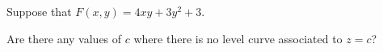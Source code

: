\begin{question}
Suppose that $F(x,y) = 4xy+3y^2+3$.  

Are there any values of $c$ where there is no level curve associated to $z=c$?
\begin{multipleChoice}
\end{multipleChoice}

\end{question}